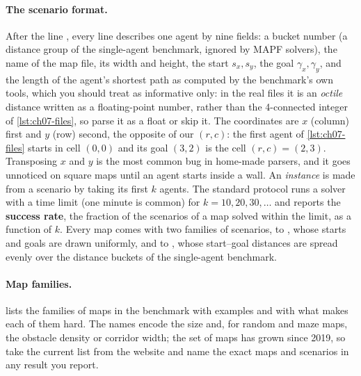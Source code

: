 \paragraph{The scenario format.}
After the line , every line describes one agent by nine
fields: a bucket number (a distance group of the single-agent benchmark,
ignored by MAPF solvers), the name of the map file, its width and height,
the start $s_x, s_y$, the goal $\gamma_x, \gamma_y$, and the length of the agent's
shortest path as computed by the benchmark's own tools, which you should
treat as informative only: in the real files it is an \emph{octile} distance
written as a floating-point number,  rather than the
4-connected integer of \cref{lst:ch07-files}, so parse it as a float or skip
it. The coordinates are $x$ (column) first and $y$
(row) second, the opposite of our $(r, c)$: the first agent of
\cref{lst:ch07-files} starts in cell $(0,0)$ and its goal $(3, 2)$ is the
cell $(r, c) = (2, 3)$. Transposing $x$ and $y$ is the most common bug in
home-made parsers, and it goes unnoticed on square maps until an agent
starts inside a wall. An \emph{instance} is made from a scenario by taking
its first $k$ agents. The
standard protocol runs a solver with a time limit (one minute is common) for
$k = 10, 20, 30, \dots$ and reports the \textbf{success rate}, the
fraction of the scenarios of a map solved within the limit, as a function of
$k$. Every map comes with two families of scenarios,  to
, whose starts and goals are drawn uniformly, and
 to , whose start--goal distances are spread
evenly over the distance buckets of the single-agent benchmark.

\paragraph{Map families.}
 lists the families of maps in the benchmark with
examples and with what makes each of them hard. The names encode the size
and, for random and maze maps, the obstacle density or corridor width; the
set of maps has grown since 2019, so take the current list from the website
and name the exact maps and scenarios in any result you report.

